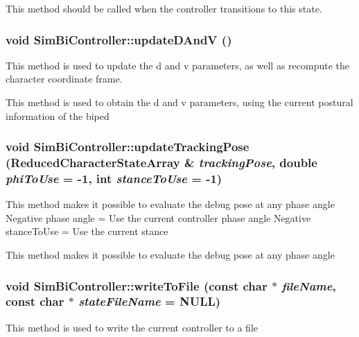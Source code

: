 \label{classCartWheel_1_1Core_1_1SimBiController_a3bde303de6008f855cc8479eb0519cb9}
This method should be called when the controller transitions to this state. \hypertarget{classCartWheel_1_1Core_1_1SimBiController_abf6fceb16393d829c92fe68990960e95}{
\subsubsection[{updateDAndV}]{\setlength{\rightskip}{0pt plus 5cm}void SimBiController::updateDAndV ()}}
\label{classCartWheel_1_1Core_1_1SimBiController_abf6fceb16393d829c92fe68990960e95}
This method is used to update the d and v parameters, as well as recompute the character coordinate frame.

This method is used to obtain the d and v parameters, using the current postural information of the biped \hypertarget{classCartWheel_1_1Core_1_1SimBiController_a97b7fc0d744a64ef1ad46335cfd038b5}{
\subsubsection[{updateTrackingPose}]{\setlength{\rightskip}{0pt plus 5cm}void SimBiController::updateTrackingPose ({\bf ReducedCharacterStateArray} \& {\em trackingPose}, \/  double {\em phiToUse} = {\ttfamily -\/1}, \/  int {\em stanceToUse} = {\ttfamily -\/1})}}
\label{classCartWheel_1_1Core_1_1SimBiController_a97b7fc0d744a64ef1ad46335cfd038b5}
This method makes it possible to evaluate the debug pose at any phase angle Negative phase angle = Use the current controller phase angle Negative stanceToUse = Use the current stance

This method makes it possible to evaluate the debug pose at any phase angle \hypertarget{classCartWheel_1_1Core_1_1SimBiController_a2f83547f429aa769f9a3a580d0b83bbc}{
\subsubsection[{writeToFile}]{\setlength{\rightskip}{0pt plus 5cm}void SimBiController::writeToFile (const char $\ast$ {\em fileName}, \/  const char $\ast$ {\em stateFileName} = {\ttfamily NULL})}}
\label{classCartWheel_1_1Core_1_1SimBiController_a2f83547f429aa769f9a3a580d0b83bbc}
This method is used to write the current controller to a file


